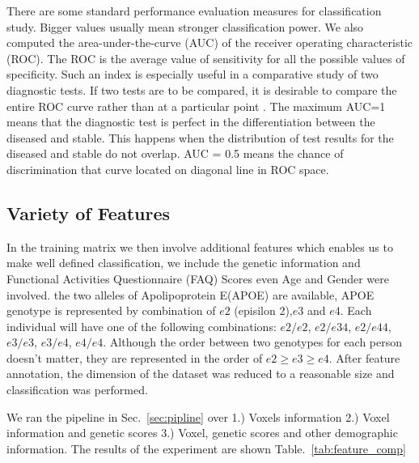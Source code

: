 \documentclass[authoryear,preprint,revi	ew,12pt]{elsarticle}
\begin{document}
There are some standard performance evaluation measures for classification study. Bigger values usually mean stronger classification power. We also computed the area-under-the-curve (AUC) of the receiver operating characteristic (ROC). The ROC is the average value of sensitivity for all the possible values of specificity. Such an index is especially useful in a comparative study of two diagnostic tests. If two tests are to be compared, it is desirable to compare the entire ROC curve rather than at a particular point \citep{swets1979roc}. The maximum AUC=1 means that the diagnostic test is perfect in the differentiation between the diseased and stable. This happens when the distribution of test results for the diseased and stable do not overlap. AUC = 0.5 means the chance of discrimination that curve located on diagonal line in ROC space. 


\subsection{Variety of Features}
\label{subsection:feature_comp}
In the training matrix we then involve additional features which enables us to make well defined classification, we include the genetic information and Functional Activities Questionnaire (FAQ) Scores even Age and Gender were involved. the two alleles of Apolipoprotein E(APOE) are available, APOE genotype is represented by combination of $e2$ (episilon 2),$e3$ and $e4$. Each individual will have one of the following combinations: $e2/e2$, $e2/e34$, $e2/e44$, $e3/e3$, $e3/e4$, $e4/e4$. Although the order between two genotypes for each person doesn't matter, they are represented in the order of $e2 \ge e3 \ge e4$. After feature annotation, the dimension of the dataset was reduced to a reasonable size and classification was performed.

We ran the pipeline in Sec.~\ref{sec:pipline} over 1.) Voxels information 2.) Voxel information and genetic scores 3.) Voxel, genetic scores and other demographic information. The results of the experiment are shown Table.~\ref{tab:feature_comp} 
\end{document}
